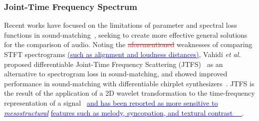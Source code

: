 \documentclass[lettersize,journal]{IEEEtran}
\makeatletter
\renewcommand{\DIFadd}[1]{\textcolor{blue}{\uline{#1}}}
\renewcommand{\DIFdel}[1]{\textcolor{red}{\sout{#1}}}
\newcommand{\todo}[1]{\textcolor{red}{#1}}
\providecommand{\gls}[1]{#1}
\providecommand{\DIFadd}[1]{{\protect\color{blue}\uwave{#1}}} %
\providecommand{\DIFdel}[1]{{\protect\color{red}\sout{#1}}} %
\providecommand{\DIFaddbegin}{} %
\providecommand{\DIFaddend}{} %
\providecommand{\DIFdelbegin}{} %
\providecommand{\DIFdelend}{} %
\providecommand{\DIFscaledelfig}{0.5}
\newlength{\DIFdelgraphicswidth} %
\newlength{\DIFdelgraphicsheight} %
\providecommand{\DIFaddincludegraphics}[2][]{{\color{blue}\fbox{\DIFOincludegraphics[#1]{#2}}}} %
\providecommand{\DIFdelincludegraphics}[2][]{%
\sbox{\DIFdelgraphicsbox}{\DIFOincludegraphics[#1]{#2}}%
\settoboxwidth{\DIFdelgraphicswidth}{\DIFdelgraphicsbox} %
\settoboxtotalheight{\DIFdelgraphicsheight}{\DIFdelgraphicsbox} %
\scalebox{\DIFscaledelfig}{%
\parbox[b]{\DIFdelgraphicswidth}{\usebox{\DIFdelgraphicsbox}\\[-\baselineskip] \rule{\DIFdelgraphicswidth}{0em}}\llap{\resizebox{\DIFdelgraphicswidth}{\DIFdelgraphicsheight}{%
\setlength{\unitlength}{\DIFdelgraphicswidth}%
\begin{picture}(1,1)%
\thicklines\linethickness{2pt} %
{\color[rgb]{1,0,0}\put(0,0){\framebox(1,1){}}}%
{\color[rgb]{1,0,0}\put(0,0){\line( 1,1){1}}}%
{\color[rgb]{1,0,0}\put(0,1){\line(1,-1){1}}}%
\end{picture}%
}\hspace*{3pt}}} %
} %
\DeclareRobustCommand{\DIFaddbegin}{\DIFOaddbegin \let\includegraphics\DIFaddincludegraphics} %
\DeclareRobustCommand{\DIFaddend}{\DIFOaddend \let\includegraphics\DIFOincludegraphics} %
\DeclareRobustCommand{\DIFdelbegin}{\DIFOdelbegin \let\includegraphics\DIFdelincludegraphics} %
\DeclareRobustCommand{\DIFdelend}{\DIFOaddend \let\includegraphics\DIFOincludegraphics} %
\let\sout@orig\sout %
\renewcommand{\sout}[1]{\ifmmode\text{\sout@orig{\ensuremath{#1}}}\else\sout@orig{#1}\fi} %
\makeatother
\begin{document}

\DIFaddend \subsubsection{Joint-Time Frequency Spectrum}
Recent works have focused on the limitations of parameter and spectral loss functions in sound-matching~\cite{vahidi2023mesostructures,uzrad2024diffmoog}, seeking to create more effective general solutions for the comparison of audio. 
Noting the \DIFdelbegin \DIFdel{aforementioned }\DIFdelend weaknesses of comparing STFT spectrograms \DIFaddbegin \DIFadd{(such as alignment and loudness distances)}\DIFaddend , Vahidi \textit{et al.} proposed differentiable Joint-Time Frequency Scattering (\gls{JTFS})~\cite{anden2015joint} as an alternative to spectrogram loss in sound-matching, and showed improved performance in sound-matching with differentiable chirplet synthesizers~\cite{vahidi2023mesostructures}. JTFS is the result of the application of a 2D wavelet transformation to the time-frequency representation of a signal~\cite{anden2015joint} \DIFaddbegin \DIFadd{and has been reported as more sensitive to }\textit{\DIFadd{mesostructural}} \DIFadd{features such as melody, syncopation, and textural
contrast~\mbox{%
\cite{vahidi2023mesostructures}}\hskip0pt%
}\DIFaddend .
\end{document}
